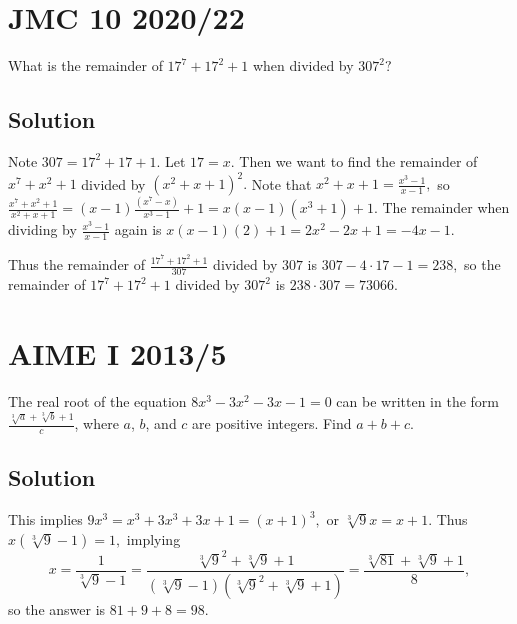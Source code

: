 \documentclass{article}
\begin{document}
\pagebreak\section{JMC 10 2020/22}

What is the remainder of $17^7+17^2+1$ when divided by $307^2?$

\subsection{Solution}

Note $307=17^2+17+1.$ Let $17=x.$ Then we want to find the remainder of $x^7+x^2+1$ divided by $(x^2+x+1)^2.$ Note that $x^2+x+1=\frac{x^3-1}{x-1},$ so $\frac{x^7+x^2+1}{x^2+x+1}=(x-1)\frac{(x^7-x)}{x^3-1}+1=x(x-1)(x^3+1)+1.$ The remainder when dividing by $\frac{x^3-1}{x-1}$ again is $x(x-1)(2)+1=2x^2-2x+1=-4x-1.$

Thus the remainder of $\frac{17^7+17^2+1}{307}$ divided by $307$ is $307-4\cdot 17-1=238,$ so the remainder of $17^7+17^2+1$ divided by $307^2$ is $238\cdot 307=73066.$

\pagebreak\section{AIME I 2013/5}

The real root of the equation $8x^3 - 3x^2 - 3x - 1 = 0$ can be written in the form $\frac{\sqrt[3]a + \sqrt[3]b + 1}{c}$, where $a$, $b$, and $c$ are positive integers. Find $a+b+c$.

\subsection{Solution}

This implies $9x^3=x^3+3x^3+3x+1=(x+1)^3,$ or $\sqrt[3]{9}x=x+1.$ Thus $x(\sqrt[3]{9}-1)=1,$ implying
\[x=\frac{1}{\sqrt[3]{9}-1}=\frac{\sqrt[3]{9}^2+\sqrt[3]{9}+1}{(\sqrt[3]{9}-1)(\sqrt[3]{9}^2+\sqrt[3]{9}+1)}=\frac{\sqrt[3]{81}+\sqrt[3]{9}+1}{8},\]
so the answer is $81+9+8=98.$

%
%
%
\end{document}
